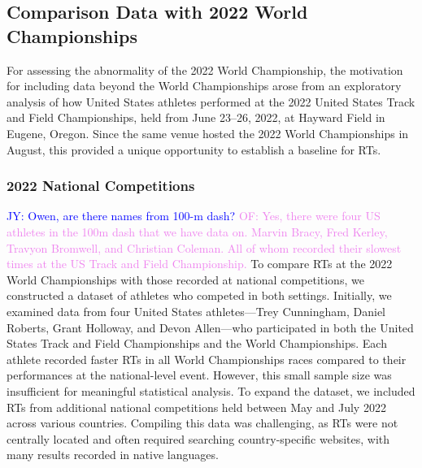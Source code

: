 \documentclass[12pt, letterpaper]{article}
\newcommand{\jy}[1]{\textcolor{blue}{JY: #1}}
\newcommand{\of}[1]{\textcolor{violet}{OF: #1}}
\begin{document}
\subsection{Comparison Data with 2022 World Championships}
\label{sec:databeyond}

For assessing the abnormality of the 2022 World Championship,
the motivation for including data beyond the World Championships arose from
an exploratory analysis of how United States athletes performed at the 2022
United States Track and Field Championships, held from June 23--26, 2022, at
Hayward Field in Eugene, Oregon. Since the same venue hosted the 2022 World
Championships in August, this provided a unique opportunity to establish a
baseline for RTs.


\subsubsection{2022 National Competitions}
\label{sec:datanational}


\jy{Owen, are there names from 100-m dash?}
\of{Yes, there were four US athletes in the 100m dash that we have data on.
Marvin Bracy, Fred Kerley, Travyon Bromwell, and Christian Coleman.  All of whom
recorded their slowest times at the US Track and Field Championship.}
To compare RTs at the 2022 World Championships with those
recorded at national competitions, we constructed a dataset of athletes
who competed in both settings. Initially, we examined data from four
United States athletes---Trey Cunningham, Daniel Roberts, Grant
Holloway, and Devon Allen---who participated in both the United States
Track and Field Championships and the World Championships. Each athlete
recorded faster RTs in all World Championships races compared
to their performances at the national-level event. However, this small
sample size was insufficient for meaningful statistical analysis. To
expand the dataset, we included RTs from additional national
competitions held between May and July 2022 across various countries.
Compiling this data was challenging, as RTs were not centrally
located and often required searching country-specific websites, with many
results recorded in native languages.
\end{document}
